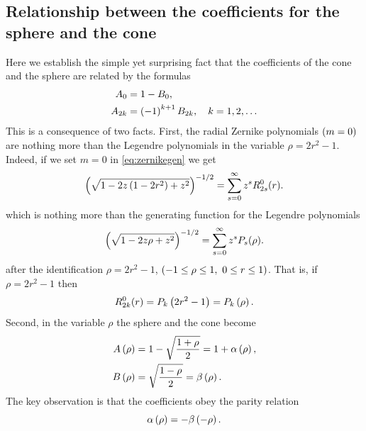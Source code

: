 \documentclass[preprint,12pt]{elsarticle}
\begin{document}
\subsection{Relationship between the coefficients for the sphere and the cone}
Here we establish the simple yet surprising fact that the coefficients of the cone and the sphere are related by the formulas
  \begin{equation}
    \begin{split}
      A_{0} &= 1 - B_{0}, \\
      A_{2k} &= \left( -1 \right)^{k+1}B_{2k}, \quad k=1,2,\dots
    \end{split}
    \label{eq:23}
  \end{equation}
This is a consequence of two facts. First, the radial Zernike polynomials $\left( m=0 \right)$ are nothing more than the Legendre polynomials in the variable $\rho=2r^{2}-1$. Indeed, if we set $m=0$ in \eqref{eq:zernikegen} we get
\begin{equation}
  \left( \sqrt{1-2z\left( 1-2r^{2} \right)+z^{2}} \right)^{-1/2} = \sum_{s=0}^{\infty} z^{s} R_{2s}^{0}(r).
\end{equation}
which is nothing more than the generating function for the Legendre polynomials
\begin{equation}
  \left( \sqrt{1-2z\rho+z^{2}} \right)^{-1/2} = \sum_{s=0}^{\infty} z^{s}P_{s}(\rho).
\end{equation}
after the identification $\rho=2r^{2}-1$, $\left( -1\le \rho \le 1,\ 0 \le r \le 1 \right)$. That is, if $\rho=2r^{2}-1$ then 
\begin{equation}
  R_{2k}^{0}(r) = P_{k}\left( 2r^{2}-1 \right) = P_{k}\left( \rho \right).
\end{equation}
Second, in the variable $\rho$ the sphere and the cone become
  \begin{equation}
    \begin{split}
      A\left( \rho \right) & = 1 - \sqrt{\frac{1+\rho}{2}} = 1 + \alpha\left( \rho \right), \\
      B\left( \rho \right) & = \sqrt{\frac{1-\rho}{2}} = \beta\left( \rho \right).
    \end{split}
    \label{eq:rhov}
  \end{equation}
The key observation is that the coefficients obey the parity relation
\begin{equation}
  \alpha\left( \rho \right) = -\beta\left( -\rho \right).
  \label{eq:parity}
\end{equation}
\end{document}
